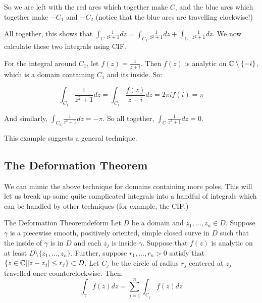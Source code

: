 \begin{ex}{}{}
So we are left with the red arcs which together make $C$, and the blue arcs which together make $-C_1$ and $-C_2$ (notice that the blue arcs are travelling clockwise!)

All together, this shows that $\int_{C}\frac{1}{z^2 + 1}dz = \int_{C_1}\frac{1}{z^2 + 1}dz + \int_{C_1}\frac{1}{z^2 + 1}dz$. We now calculate these two integrals using CIF.

For the integral around $C_1$, let $f(z) = \frac{1}{z+i}$. Then $f(z)$ is analytic on $\mathbb{C}\setminus\{-i\}$, which is a domain containing $C_1$ and its inside. So:

$$\int_{C_1} \frac{1}{z^2+1} dz = \int_{C_1}\frac{f(z)}{z-i}dz = 2\pi i f(i) = \pi$$

And similarly, $\int_{C_2}\frac{1}{z^2 + 1}dz = -\pi$. So all together, $\int_C \frac{1}{z^2+1}dz = 0$.
\end{ex}

This example suggests a general technique.

\subsection{The Deformation Theorem}

We can mimic the above technique for domains containing more poles. This will let us break up some quite complicated integrals into a handful of integrals which can be handled by other techniques (for example, the CIF.)

\begin{thmbo}{The Deformation Theorem}{deform} Let $D$ be a domain and $z_1,\dots,z_n \in D$. Suppose $\gamma$ is a piecewise smooth, positively oriented, simple closed curve in $D$ such that the inside of $\gamma$ is in $D$ and each $z_j$ is inside $\gamma$. Suppose that $f(z)$ is analytic on at least $D\setminus\{z_1,\dots,z_n\}$. Further, suppose $r_1,\dots,r_n > 0$ satisfy that $\{z\in\mathbb{C}||z-z_j| \le r_j\}\subset D$. Let $C_j$ be the circle of radius $r_j$ centered at $z_j$ travelled once counterclockwise. Then:
$$\int_{\gamma} f(z)dz = \sum_{j=1}^n \int_{C_j} f(z)dz$$
\end{thmbo}

